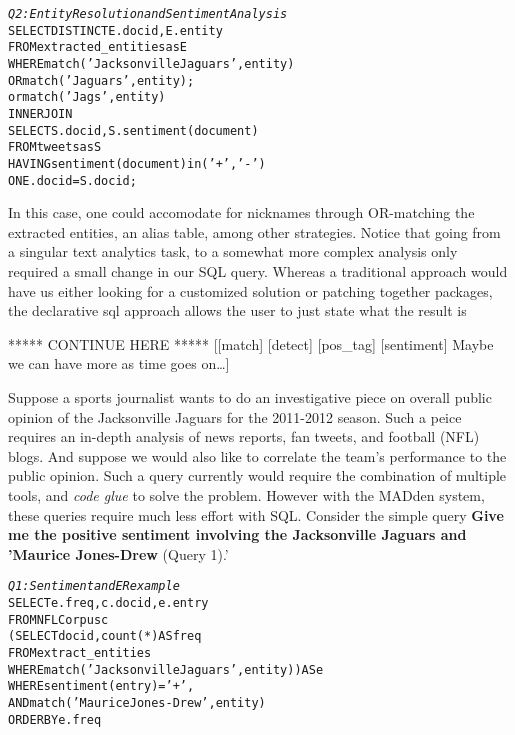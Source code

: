 \begin{small}
\begin{alltt}
\textit{Q2: Entity Resolution and Sentiment Analysis}
SELECT DISTINCT E.docid, E.entity
FROM extracted_entities as E
WHERE match('Jacksonville Jaguars', entity)
   OR match('Jaguars', entity);
   or match('Jags', entity)
INNER JOIN
SELECT S.docid, S.sentiment(document)
FROM tweets as S
HAVING sentiment(document) in ('+', '-')
ON E.docid = S.docid;

\end{alltt}
\end{small}

In this case, one could accomodate for nicknames through OR-matching
the extracted entities, an alias table, among other strategies. Notice
that going from a singular text analytics task, to a somewhat more 
complex analysis only required a small change in our SQL query. 
Whereas a traditional approach would have us either looking for a
customized solution or patching together packages, the declarative
sql approach allows the user to just state what the result is


***** CONTINUE HERE *****
[[match]
 [detect]
 [pos_tag]
 [sentiment]
 Maybe we can have more as time goes on\ldots]


Suppose a sports journalist wants to do an investigative
piece on overall public opinion of the Jacksonville Jaguars
for the 2011-2012 season. Such a peice requires an in-depth analysis of news
reports, fan tweets, and football (NFL) blogs. And suppose we would also like 
to correlate the team's performance to the public opinion. Such a query
currently would require the combination of multiple tools, and \textit{code glue}
to solve the problem. However with the MADden system, these queries require much
less effort with SQL. Consider the simple query \textbf{Give me the positive
sentiment involving the Jacksonville Jaguars and 'Maurice Jones-Drew} (Query 1).' 

\begin{small}
\begin{alltt}
\textit{Q1: Sentiment and ER example }
SELECT e.freq, c.docid,  e.entry
FROM NFLCorpus c
    (SELECT docid, count(*) AS freq
    FROM extract_entities
    WHERE match('Jacksonville Jaguars', entity)) AS e
WHERE sentiment(entry) = '+',
AND match('Maurice Jones-Drew', entity)
ORDER BY e.freq
\end{alltt}
\end{small}
\label{}

